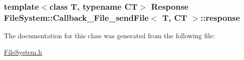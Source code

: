 \subsubsection[{response}]{\setlength{\rightskip}{0pt plus 5cm}template$<$class T, typename C\+T$>$ {\bf Response} {\bf File\+System\+::\+Callback\+\_\+\+File\+\_\+send\+File}$<$ T, C\+T $>$\+::response}\label{class_file_system_1_1_callback___file__send_file_a5a393b1e37b7cd16f4154ca5c91af37e}


The documentation for this class was generated from the following file\+:\begin{DoxyCompactItemize}
\item 
\hyperlink{_file_system_8h}{File\+System.\+h}\end{DoxyCompactItemize}
